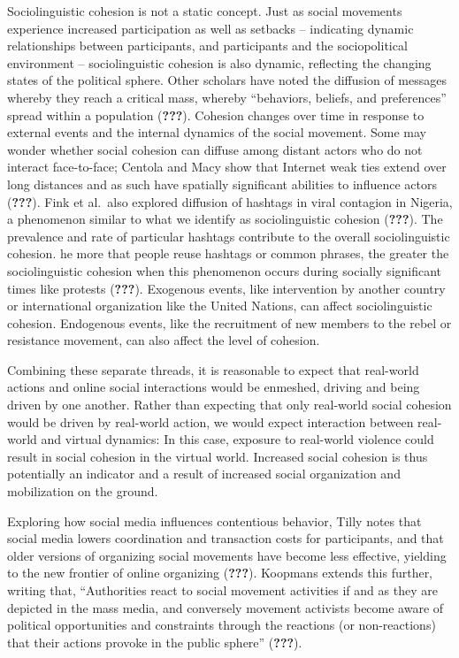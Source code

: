\documentclass[english,man]{apa6}
\begin{document}
Sociolinguistic cohesion is not a static concept. Just as social movements experience increased participation as well as setbacks -- indicating dynamic relationships between participants, and participants and the sociopolitical environment -- sociolinguistic cohesion is also dynamic, reflecting the changing states of the political sphere. Other scholars have noted the diffusion of messages whereby they reach a critical mass, whereby \enquote{behaviors, beliefs, and preferences} spread within a population ({\textbf{???}}). Cohesion changes over time in response to external events and the internal dynamics of the social movement. Some may wonder whether social cohesion can diffuse among distant actors who do not interact face-to-face; Centola and Macy show that Internet weak ties extend over long distances and as such have spatially significant abilities to influence actors ({\textbf{???}}). Fink et al.~also explored diffusion of hashtags in viral contagion in Nigeria, a phenomenon similar to what we identify as sociolinguistic cohesion ({\textbf{???}}). The prevalence and rate of particular hashtags contribute to the overall sociolinguistic cohesion. he more that people reuse hashtags or common phrases, the greater the sociolinguistic cohesion when this phenomenon occurs during socially significant times like protests ({\textbf{???}}). Exogenous events, like intervention by another country or international organization like the United Nations, can affect sociolinguistic cohesion. Endogenous events, like the recruitment of new members to the rebel or resistance movement, can also affect the level of cohesion.

Combining these separate threads, it is reasonable to expect that real-world actions
and online social interactions would be enmeshed, driving and being driven by
one another. Rather than expecting that only real-world social cohesion would be
driven by real-world action, we would expect interaction between real-world and
virtual dynamics: In this case, exposure to real-world violence could result in social
cohesion in the virtual world. Increased social cohesion is thus potentially
an indicator and a result of increased social organization and mobilization
on the ground.

Exploring how social media influences contentious behavior, Tilly notes that social media lowers coordination and transaction costs for participants, and that older versions of organizing social movements have become less effective, yielding to the new frontier of online organizing ({\textbf{???}}). Koopmans extends this further, writing that, \enquote{Authorities react to social movement activities if and as they are depicted in the mass media, and conversely movement activists become aware of political opportunities and constraints through the reactions (or non-reactions) that their actions provoke in the public sphere} ({\textbf{???}}).
\end{document}
